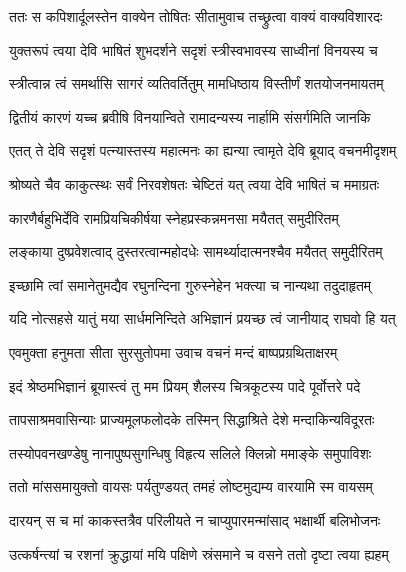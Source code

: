 
\twolineshloka
{ततः स कपिशार्दूलस्तेन वाक्येन तोषितः}
{सीतामुवाच तच्छ्रुत्वा वाक्यं वाक्यविशारदः} %

\twolineshloka
{युक्तरूपं त्वया देवि भाषितं शुभदर्शने}
{सदृशं स्त्रीस्वभावस्य साध्वीनां विनयस्य च} %

\twolineshloka
{स्त्रीत्वान्न त्वं समर्थासि सागरं व्यतिवर्तितुम्}
{मामधिष्ठाय विस्तीर्णं शतयोजनमायतम्} %

\twolineshloka
{द्वितीयं कारणं यच्च ब्रवीषि विनयान्विते}
{रामादन्यस्य नार्हामि संसर्गमिति जानकि} %

\twolineshloka
{एतत् ते देवि सदृशं पत्न्यास्तस्य महात्मनः}
{का ह्यन्या त्वामृते देवि ब्रूयाद् वचनमीदृशम्} %

\twolineshloka
{श्रोष्यते चैव काकुत्स्थः सर्वं निरवशेषतः}
{चेष्टितं यत् त्वया देवि भाषितं च ममाग्रतः} %

\twolineshloka
{कारणैर्बहुभिर्देवि रामप्रियचिकीर्षया}
{स्नेहप्रस्कन्नमनसा मयैतत् समुदीरितम्} %

\twolineshloka
{लङ्काया दुष्प्रवेशत्वाद् दुस्तरत्वान्महोदधेः}
{सामर्थ्यादात्मनश्चैव मयैतत् समुदीरितम्} %

\twolineshloka
{इच्छामि त्वां समानेतुमद्यैव रघुनन्दिना}
{गुरुस्नेहेन भक्त्या च नान्यथा तदुदाहृतम्} %

\twolineshloka
{यदि नोत्सहसे यातुं मया सार्धमनिन्दिते}
{अभिज्ञानं प्रयच्छ त्वं जानीयाद् राघवो हि यत्} %

\twolineshloka
{एवमुक्ता हनुमता सीता सुरसुतोपमा}
{उवाच वचनं मन्दं बाष्पप्रग्रथिताक्षरम्} %

\twolineshloka
{इदं श्रेष्ठमभिज्ञानं ब्रूयास्त्वं तु मम प्रियम्}
{शैलस्य चित्रकूटस्य पादे पूर्वोत्तरे पदे} %

\twolineshloka
{तापसाश्रमवासिन्याः प्राज्यमूलफलोदके}
{तस्मिन् सिद्धाश्रिते देशे मन्दाकिन्यविदूरतः} %

\twolineshloka
{तस्योपवनखण्डेषु नानापुष्पसुगन्धिषु}
{विहृत्य सलिले क्लिन्नो ममाङ्के समुपाविशः} %

\twolineshloka
{ततो मांससमायुक्तो वायसः पर्यतुण्डयत्}
{तमहं लोष्टमुद्यम्य वारयामि स्म वायसम्} %

\twolineshloka
{दारयन् स च मां काकस्तत्रैव परिलीयते}
{न चाप्युपारमन्मांसाद् भक्षार्थी बलिभोजनः} %

\twolineshloka
{उत्कर्षन्त्यां च रशनां क्रुद्धायां मयि पक्षिणे}
{स्रंसमाने च वसने ततो दृष्टा त्वया ह्यहम्} %

